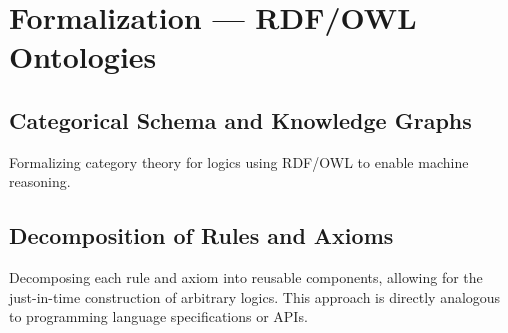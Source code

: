 
\chapter*{Formalization --- RDF/OWL Ontologies}

\section*{Categorical Schema and Knowledge Graphs}
Formalizing category theory for logics using RDF/OWL to enable machine reasoning.

\section*{Decomposition of Rules and Axioms}
Decomposing each rule and axiom into reusable components, allowing for the just-in-time construction of arbitrary logics. This approach is directly analogous to programming language specifications or APIs.
